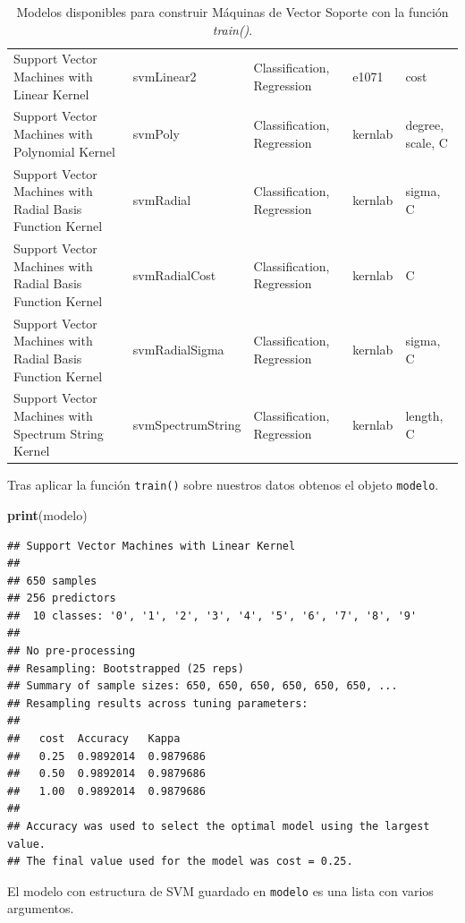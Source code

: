 \documentclass[12pt,spanish,a4paper]{article}
\newenvironment{Shaded}{\begin{snugshade}}{\end{snugshade}}
\newcommand{\KeywordTok}[1]{\textcolor[rgb]{0.13,0.29,0.53}{\textbf{#1}}}
\newcommand{\OperatorTok}[1]{\textcolor[rgb]{0.81,0.36,0.00}{\textbf{#1}}}
\newcommand{\NormalTok}[1]{#1}
\numberwithin{equation}{section}
\begin{document}
\begin{table}[ht]
{\begin{tabular}{p{5cm}p{5cm}p{3cm}p{2cm}p{3cm}}
  Support Vector Machines with Linear Kernel & svmLinear2 & Classification, Regression & e1071 & cost \\ 
  Support Vector Machines with Polynomial Kernel & svmPoly & Classification, Regression & kernlab & degree, scale, C \\ 
  Support Vector Machines with Radial Basis Function Kernel & svmRadial & Classification, Regression & kernlab & sigma, C \\ 
  Support Vector Machines with Radial Basis Function Kernel & svmRadialCost & Classification, Regression & kernlab & C \\ 
  Support Vector Machines with Radial Basis Function Kernel & svmRadialSigma & Classification, Regression & kernlab & sigma, C \\ 
  Support Vector Machines with Spectrum String Kernel & svmSpectrumString & Classification, Regression & kernlab & length, C \\ 
   \hline
\hline
\end{tabular}
}
\caption{Modelos disponibles para construir Máquinas de Vector Soporte con la función {\it train()}.} 
\label{tab:train_models}
\end{table}

Tras aplicar la función \texttt{train()} sobre nuestros datos obtenos el
objeto \texttt{modelo}.

\begin{Shaded}
\begin{Highlighting}[]
\KeywordTok{print}\NormalTok{(modelo)}
\end{Highlighting}
\end{Shaded}

\begin{verbatim}
## Support Vector Machines with Linear Kernel 
## 
## 650 samples
## 256 predictors
##  10 classes: '0', '1', '2', '3', '4', '5', '6', '7', '8', '9' 
## 
## No pre-processing
## Resampling: Bootstrapped (25 reps) 
## Summary of sample sizes: 650, 650, 650, 650, 650, 650, ... 
## Resampling results across tuning parameters:
## 
##   cost  Accuracy   Kappa    
##   0.25  0.9892014  0.9879686
##   0.50  0.9892014  0.9879686
##   1.00  0.9892014  0.9879686
## 
## Accuracy was used to select the optimal model using the largest value.
## The final value used for the model was cost = 0.25.
\end{verbatim}

El modelo con estructura de SVM guardado en \texttt{modelo} es una lista
con varios argumentos.

\begin{Shaded}
\end{Shaded}
\end{document}
